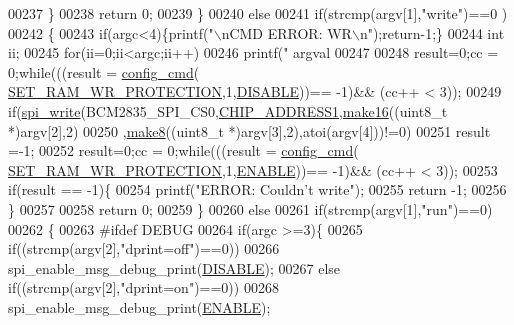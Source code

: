 \begin{DoxyCode}
{{00237         \}
00238      \textcolor{keywordflow}{return} 0;
00239      \}
00240      \textcolor{keywordflow}{else} 
00241      \textcolor{keywordflow}{if}(strcmp(argv[1],\textcolor{stringliteral}{"write"})==0 )
00242      \{
00243         \textcolor{keywordflow}{if}(argc<4)\{printf(\textcolor{stringliteral}{"\(\backslash\)nCMD ERROR: WR\(\backslash\)n"});\textcolor{keywordflow}{return}-1;\}
00244     \textcolor{keywordtype}{int} ii;
00245        \textcolor{keywordflow}{for}(ii=0;ii<argc;ii++)
00246             printf(\textcolor{stringliteral}{" argval %
00247         
00248         result=0;cc = 0;\textcolor{keywordflow}{while}(((result = \hyperlink{a00004_ga369ee0e8379941cbc2c79b90ec3292da}{config\_cmd}(
      \hyperlink{a00042_a5b534b9caab512045a6e762f3930a501}{SET\_RAM\_WR\_PROTECTION},1,\hyperlink{a00036_a99496f7308834e8b220f7894efa0b6ab}{DISABLE}))== -1)&& (cc++ < 3)); 
00249         \textcolor{keywordflow}{if}(\hyperlink{a00006_ga2770219ad8ad1eda1817c0df934b47d0}{spi\_write}(BCM2835\_SPI\_CS0,\hyperlink{a00036_a94de2b046db6e10257ef4481c0a15eaa}{CHIP\_ADDRESS1},\hyperlink{a00008_ga1e74920f34a07a82cca58eab71ed12b3}{make16}((uint8\_t *)argv[2],2)
00250         ,\hyperlink{a00008_gaefa26c3e5b22ccbe5de1c33305f20e1b}{make8}((uint8\_t *)argv[3],2),atoi(argv[4]))!=0)
00251           result =-1;
00252          result=0;cc = 0;\textcolor{keywordflow}{while}(((result = \hyperlink{a00004_ga369ee0e8379941cbc2c79b90ec3292da}{config\_cmd}(
      \hyperlink{a00042_a5b534b9caab512045a6e762f3930a501}{SET\_RAM\_WR\_PROTECTION},1,\hyperlink{a00036_a514ad415fb6125ba296793df7d1a468a}{ENABLE}))== -1)&& (cc++ < 3)); 
00253          \textcolor{keywordflow}{if}(result == -1)\{
00254                     printf(\textcolor{stringliteral}{"ERROR: Couldn't write"});  
00255                       \textcolor{keywordflow}{return} -1;
00256          \}
00257          
00258      \textcolor{keywordflow}{return} 0;
00259      \}
00260      \textcolor{keywordflow}{else}
00261      \textcolor{keywordflow}{if}(strcmp(argv[1],\textcolor{stringliteral}{"run"})==0) 
00262      \{
00263 \textcolor{preprocessor}{        #ifdef DEBUG}
00264 \textcolor{preprocessor}{}        \textcolor{keywordflow}{if}(argc >=3)\{
00265            \textcolor{keywordflow}{if}((strcmp(argv[2],\textcolor{stringliteral}{"dprint=off"})==0))
00266                spi\_enable\_msg\_debug\_print(\hyperlink{a00036_a99496f7308834e8b220f7894efa0b6ab}{DISABLE});
00267             \textcolor{keywordflow}{else} \textcolor{keywordflow}{if}((strcmp(argv[2],\textcolor{stringliteral}{"dprint=on"})==0))
00268                 spi\_enable\_msg\_debug\_print(\hyperlink{a00036_a514ad415fb6125ba296793df7d1a468a}{ENABLE});
}}}
\end{DoxyCode}
